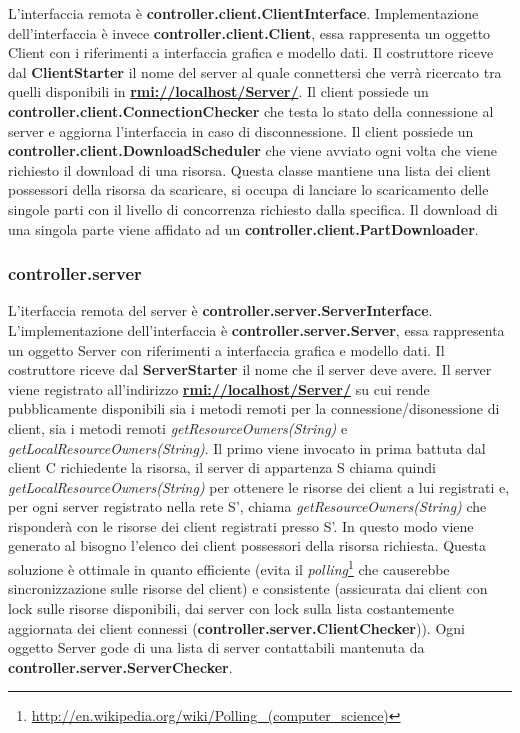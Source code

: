\documentclass[
10pt, %
a4paper, %
oneside, %
BCOR5mm, %
]{scrartcl}
\begin{document}
 			L'interfaccia remota è \textbf{controller.client.ClientInterface}.
 			Implementazione dell'interfaccia è invece \textbf{controller.client.Client}, essa rappresenta un oggetto Client con i riferimenti a interfaccia grafica e modello dati. Il costruttore riceve dal \textbf{ClientStarter} il nome del server al quale connettersi che verrà ricercato tra quelli disponibili in \textbf{\href{rmi://localhost/Server/}{rmi://localhost/Server/}}. Il client possiede un \textbf{controller.client.ConnectionChecker} che testa lo stato della connessione al server e aggiorna l'interfaccia in caso di disconnessione. Il client possiede un \textbf{controller.client.DownloadScheduler} che viene avviato ogni volta che viene richiesto il download di una risorsa. Questa classe mantiene una lista dei client possessori della risorsa da scaricare, si occupa di lanciare lo scaricamento delle singole parti con il livello di concorrenza richiesto dalla specifica. Il download di una singola parte viene affidato ad un \textbf{controller.client.PartDownloader}.

 		\subsubsection{controller.server}

 			L'iterfaccia remota del server è \textbf{controller.server.ServerInterface}. L'implementazione dell'interfaccia è \textbf{controller.server.Server}, essa rappresenta un oggetto Server con riferimenti a interfaccia grafica e modello dati. Il costruttore riceve dal \textbf{ServerStarter} il nome che il server deve avere. Il server viene registrato all'indirizzo \textbf{\href{rmi://localhost/Server/nome_server}{rmi://localhost/Server/}} su cui rende pubblicamente disponibili sia i metodi remoti per la connessione/disonessione di client, sia i metodi remoti \emph{getResourceOwners(String)} e \emph{getLocalResourceOwners(String)}.
 			Il primo viene invocato in prima battuta dal client C richiedente la risorsa, il server di appartenza S chiama quindi \emph{getLocalResourceOwners(String)} per ottenere le risorse dei client a lui registrati e, per ogni server registrato nella rete S', chiama \emph{getResourceOwners(String)} che risponderà con le risorse dei client registrati presso S'. In questo modo viene generato al bisogno l'elenco dei client possessori della risorsa richiesta. Questa soluzione è ottimale in quanto efficiente (evita il \emph{polling}\footnote{\href{http://en.wikipedia.org/wiki/Polling_(computer_science)}{http://en.wikipedia.org/wiki/Polling\_(computer\_science)}} che causerebbe  sincronizzazione sulle risorse del client) e consistente (assicurata dai client con lock sulle risorse disponibili, dai server con lock sulla lista costantemente aggiornata dei client connessi (\textbf{controller.server.ClientChecker})). Ogni oggetto Server gode di una lista di server contattabili mantenuta da \textbf{controller.server.ServerChecker}.
\end{document}
